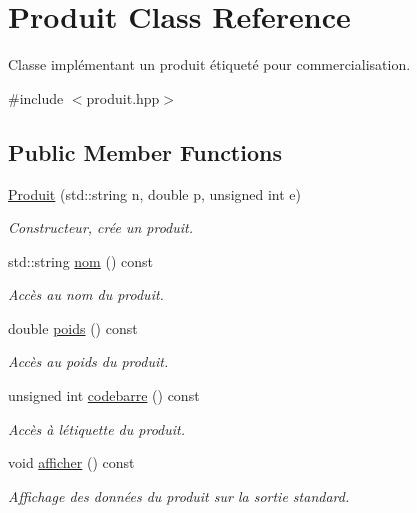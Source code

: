 \hypertarget{class_produit}{}\section{Produit Class Reference}
\label{class_produit}


Classe implémentant un produit étiqueté pour commercialisation.  




{\ttfamily \#include $<$produit.\+hpp$>$}

\subsection*{Public Member Functions}
\begin{DoxyCompactItemize}
\item 
\hyperlink{class_produit_aed5e9dcc7f27fdf076d2ee8d9f02b11d}{Produit} (std\+::string n, double p, unsigned int e)
\begin{DoxyCompactList}\small\item\em Constructeur, crée un produit. \end{DoxyCompactList}\item 
std\+::string \hyperlink{class_produit_abdcb584b2dc98be17f1438e90b43fe43}{nom} () const 
\begin{DoxyCompactList}\small\item\em Accès au nom du produit. \end{DoxyCompactList}\item 
double \hyperlink{class_produit_a2dd690f1fcbe4fc7d59ba6b3bcc6d255}{poids} () const 
\begin{DoxyCompactList}\small\item\em Accès au poids du produit. \end{DoxyCompactList}\item 
unsigned int \hyperlink{class_produit_a7577dea6c7bcf0e07f063972c4b21c85}{codebarre} () const 
\begin{DoxyCompactList}\small\item\em Accès à l\textquotesingle{}étiquette du produit. \end{DoxyCompactList}\item 
\hypertarget{class_produit_a018714e797888203d68f727265e5eb6a}{}void \hyperlink{class_produit_a018714e797888203d68f727265e5eb6a}{afficher} () const \label{class_produit_a018714e797888203d68f727265e5eb6a}

\begin{DoxyCompactList}\small\item\em Affichage des données du produit sur la sortie standard. \end{DoxyCompactList}\end{DoxyCompactItemize}


